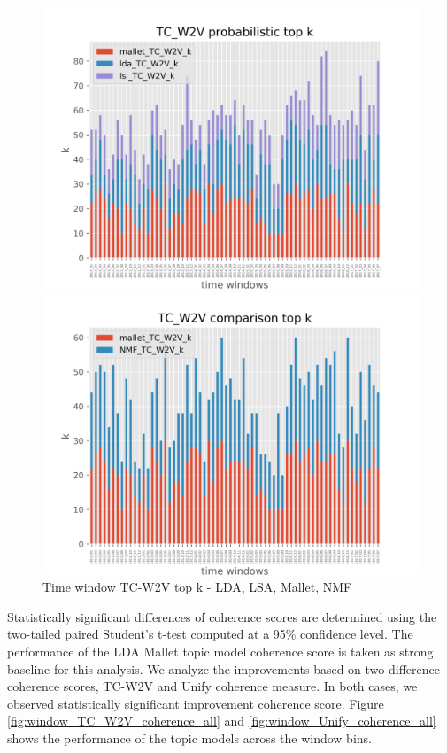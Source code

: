 \begin{figure}[!ht]
  \centering
  \begin{minipage}[b]{0.45\textwidth}
    \includegraphics[width=\textwidth]{img/TC_W2V_probabilistic_top_k_all_topK_plot.png}
  \end{minipage}
  \hfill
  \begin{minipage}[b]{0.45\textwidth}
    \includegraphics[width=\textwidth]{img/TC_W2V_comparison_top_k_all_topK_plot.png}
  \end{minipage}
  \caption{Time window TC-W2V top k - LDA, LSA, Mallet, NMF}
  \label{fig:window_TC_W2V_k_all}
\end{figure}


Statistically significant differences of coherence scores are determined using the two-tailed paired Student’s t-test computed  at  a  95\%  confidence  level. The performance of the LDA Mallet topic model coherence score is taken as strong baseline for this analysis. We analyze the improvements based on two difference coherence scores, TC-W2V and Unify coherence measure. In both cases, we observed statistically significant improvement coherence score. Figure \ref{fig:window_TC_W2V_coherence_all} and \ref{fig:window_Unify_coherence_all} shows the performance of the topic models across the window bins.

